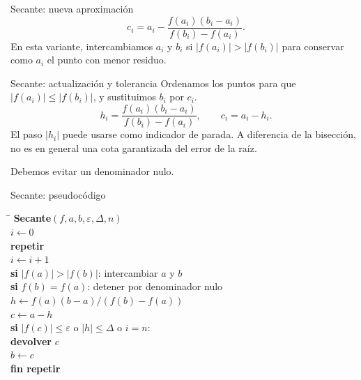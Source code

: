 \documentclass[original_version/main.tex]{subfiles}
\begin{document}
\begin{frame}{Secante: nueva aproximación}
\[\boxed{c_i=a_i-\frac{f(a_i)(b_i-a_i)}{f(b_i)-f(a_i)}.}\]En esta variante, intercambiamos $a_i$ y $b_i$ si $|f(a_i)|>|f(b_i)|$ para conservar como $a_i$ el punto con menor residuo.
\end{frame}

\begin{frame}{Secante: actualización y tolerancia}
\small Ordenamos los puntos para que $|f(a_i)|\le|f(b_i)|$, y sustituimos $b_i$ por $c_i$.\[h_i=\frac{f(a_i)(b_i-a_i)}{f(b_i)-f(a_i)},\qquad c_i=a_i-h_i.\]El paso $|h_i|$ puede usarse como indicador de parada. A diferencia de la bisección, no es en general una cota garantizada del error de la raíz.\par\medskip Debemos evitar un denominador nulo.
\end{frame}

\begin{frame}{Secante: pseudocódigo}
\footnotesize\begin{tabbing}\hspace{4mm}\=\hspace{5mm}\=\kill
\textbf{Secante}$(f,a,b,\varepsilon,\Delta,n)$\\
$i\gets0$\\
\textbf{repetir}\\
\>$i\gets i+1$\\
\>\textbf{si} $|f(a)|>|f(b)|$: intercambiar $a$ y $b$\\
\>\textbf{si} $f(b)=f(a)$: detener por denominador nulo\\
\>$h\gets f(a)(b-a)/(f(b)-f(a))$\\
\>$c\gets a-h$\\
\>\textbf{si} $|f(c)|\le\varepsilon$ o $|h|\le\Delta$ o $i=n$:\\
\>\>\textbf{devolver} $c$\\
\>$b\gets c$\\
\textbf{fin repetir}
\end{tabbing}
\end{frame}
\end{document}
